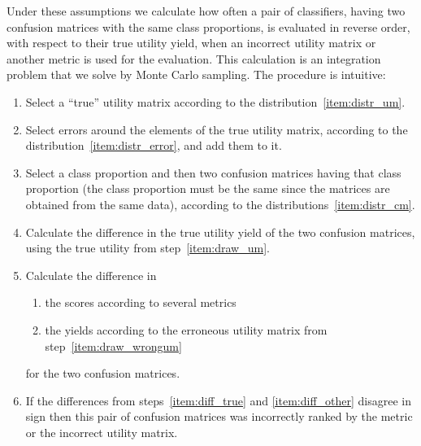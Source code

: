 \documentclass[\ifafour a4paper,12pt,\else a5paper,10pt,\fi%
onecolumn,oneside,article,%
british%
]{memoir}
\theoremstyle{remark}
\theoremstyle{innote}
\renewcommand*{\|}[1][]{\nonscript\:#1\vert\nonscript\:\mathopen{}}
\begin{document}
Under these assumptions we calculate how often a pair of classifiers, having two confusion matrices with the same class proportions, is evaluated in reverse order, with respect to their true utility yield, when an incorrect utility matrix or another metric is used for the evaluation. This calculation is an integration problem that we solve by Monte Carlo sampling. The procedure is intuitive:
\begin{enumerate}[label=\arabic*.,ref=\arabic*]
\item\label{item:draw_um} Select a \enquote{true} utility matrix according to the distribution~\ref{item:distr_um}.
\item\label{item:draw_wrongum} Select errors around the elements of the true utility matrix, according to the distribution~\ref{item:distr_error}, and add them to it.
\item\label{item:draw_cm} Select a class proportion and then two confusion matrices having that class proportion (the class proportion must be the same since the matrices are obtained from the same data), according to the distributions~\ref{item:distr_cm}.
\item\label{item:diff_true} Calculate the difference in the true utility yield of the two confusion matrices, using the true utility from step~\ref{item:draw_um}.
\item\label{item:diff_other} Calculate the difference in
  \begin{enumerate}[label=\theenumi\alph*.]
  \item the scores according to several metrics
  \item the yields according to the erroneous utility matrix from step~\ref{item:draw_wrongum}
  \end{enumerate}
for the two confusion matrices.
\item If the differences from steps~\ref{item:diff_true} and \ref{item:diff_other} disagree in sign then this pair of confusion matrices was incorrectly ranked by the metric or the incorrect utility matrix.
\end{enumerate}
\end{document}
